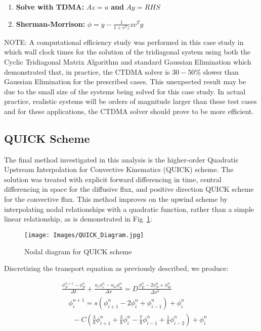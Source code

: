 \documentclass[twocolumn,10pt]{asme2ej}
\begin{document}
\begin{enumerate}
	\item \textbf{Solve with TDMA:} $Az=u$ \textbf{and} $Ay=RHS$
	\item  \textbf{Sherman-Morrison:} $\phi = y - \frac{1}{1+v^Tz}zv^Ty$
\end{enumerate}

\noindent NOTE:  A computational efficiency study was performed in this case study in which wall clock times for the solution of the tridiagonal system using both the Cyclic Tridiagonal Matrix Algorithm and standard Gaussian Elimination which demonstrated that, in practice, the CTDMA solver is $30-50\%$ slower than Gaussian Elimination for the prescribed cases.  This unexpected result may be due to the small size of the systems being solved for this case study.  In actual practice, realistic systems will be orders of magnitude larger than these test cases and for these applications, the CTDMA solver should prove to be more efficient.
 

\subsection{QUICK Scheme}

The final method investigated in this analysis is the higher-order Quadratic Upstream Interpolation for Convective Kinematics (QUICK) scheme.  The solution was treated with explicit forward differencing in time, central differencing in space for the diffusive flux, and positive direction QUICK scheme for the convective flux.  This method improves on the upwind scheme by interpolating nodal relationships with a quadratic function, rather than a simple linear relationship, as is demonstrated in Fig~\ref{QUICK}:

\begin{figure}[thb]
\begin{center}
\texttt{[image: Images/QUICK\_Diagram.jpg]}
\caption{Nodal diagram for QUICK scheme}
\label{QUICK}
\end{center}
\end{figure}

Discretizing the transport equation as previously described, we produce:

\begin{equation}
\begin{split}
&\frac{\phi^{n+1}_{P} - \phi^{n}_{P}}{\Delta t} + \frac{u_e\phi^{n}_{e} - u_w\phi^{n}_{w}}{\Delta x} = D\frac{\phi^{n}_{E} -   2\phi^{n}_{P} + \phi^{n}_{W}}{\Delta x^2}\\
&\quad \phi^{n+1}_{i} = s(\phi^{n}_{i+1} - 2\phi^{n}_{i} + \phi^{n}_{i-1})+ \phi^{n}_{i}\\
& \quad \;\; - C(\frac{3}{8}\phi^{n}_{i+1} + \frac{3}{8}\phi^{n}_{i} - \frac{7}{8}\phi^{n}_{i-1} + \frac{1}{8}\phi^{n}_{i-2}) + \phi^{n}_{i}
\end{split}
\end{equation}
\end{document}

